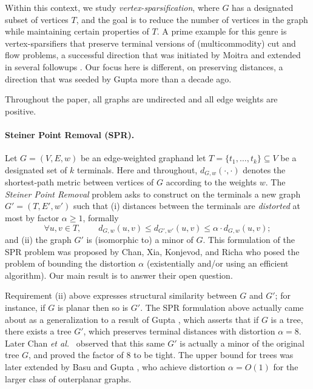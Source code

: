 \documentclass[twoside,leqno,twocolumn]{article}
\newcommand{\etal}{{\em et al.\ }\xspace}
\providecommand{\aset}[1]{\{#1\}}
\begin{document}
Within this context, we study \emph{vertex-sparsification},
where $G$ has a designated subset of vertices $T$,
and the goal is to reduce the number of vertices in the graph
while maintaining certain properties of $T$.
A prime example for this genre is vertex-sparsifiers
that preserve terminal versions of (multicommodity) cut and flow problems, 
a successful direction that was initiated by Moitra \cite{Moitra09} 
and extended in several followups \cite{LM10,CLLM10,MM10,EGKRTT10,Chuzhoy12}.
Our focus here is different, on preserving distances, 
a direction that was seeded by Gupta \cite{Gupta01} more than a decade ago.

Throughout the paper, all graphs are undirected and all edge weights are positive.

\paragraph{Steiner Point Removal (SPR).}
Let $G=(V,E,w)$ be an edge-weighted graphand let $T=\aset{t_1,\ldots,t_k}\subseteq V$ be a designated set of $k$ terminals.
Here and throughout, $d_{G,w}(\cdot,\cdot)$ denotes the shortest-path metric 
between vertices of $G$ according to the weights $w$.
The \emph{Steiner Point Removal} problem asks to construct on the terminals
a new graph $G'=(T,E',w')$ such that
(i)  
distances between the terminals are \emph{distorted} at most 
by factor $\alpha\ge 1$, formally
$$
\forall u,v\in T,\qquad d_{G,w}(u,v) \le d_{G',w'}(u,v) \le \alpha\cdot d_{G,w}(u,v);
$$
and (ii) the graph $G'$ is (isomorphic to) a minor of $G$.
This formulation of the SPR problem was proposed by
Chan, Xia, Konjevod, and Richa \cite[Section 5]{CXKR06}
who posed the problem of bounding the distortion $\alpha$
(existentially and/or using an efficient algorithm).
Our main result is to answer their open question.

Requirement (ii) above expresses structural similarity between $G$ and $G'$; 
for instance, if $G$ is planar then so is $G'$.
The SPR formulation above actually came about as a generalization 
to a result of Gupta \cite{Gupta01}, which
asserts that if $G$ is a tree, there exists a tree $G'$, which preserves terminal distances with distortion $\alpha=8$.
Later Chan \etal \cite{CXKR06} observed that this same $G'$ 
is actually a minor of the original tree $G$,
and proved the factor of $8$ to be tight.
The upper bound for trees was later extended by Basu and Gupta \cite{BG08},
who achieve distortion $\alpha=O(1)$ for the larger class of outerplanar graphs.
\end{document}
